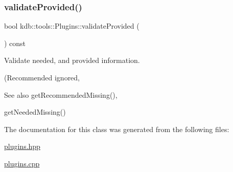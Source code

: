 \subsubsection{\texorpdfstring{validate\+Provided()}{validateProvided()}}
{\footnotesize\ttfamily bool kdb\+::tools\+::\+Plugins\+::validate\+Provided (\begin{DoxyParamCaption}{ }\end{DoxyParamCaption}) const}



Validate needed, and provided information. 

(Recommended ignored, \begin{DoxySeeAlso}{See also}
get\+Recommended\+Missing(), 

get\+Needed\+Missing() 
\end{DoxySeeAlso}


The documentation for this class was generated from the following files\+:\begin{DoxyCompactItemize}
\item 
\hyperlink{plugins_8hpp}{plugins.\+hpp}\item 
\hyperlink{plugins_8cpp}{plugins.\+cpp}\end{DoxyCompactItemize}
